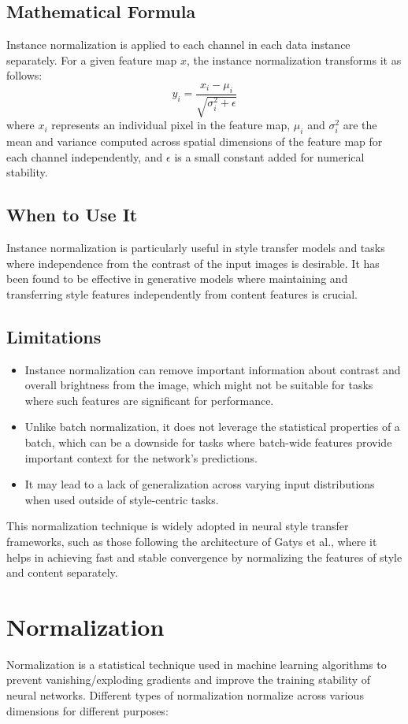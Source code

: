 \documentclass[12pt]{article}
\begin{document}
\subsection{Mathematical Formula}
Instance normalization is applied to each channel in each data instance separately. For a given feature map \(x\), the instance normalization transforms it as follows:
\[
y_i = \frac{x_i - \mu_i}{\sqrt{\sigma_i^2 + \epsilon}}
\]
where \(x_i\) represents an individual pixel in the feature map, \(\mu_i\) and \(\sigma_i^2\) are the mean and variance computed across spatial dimensions of the feature map for each channel independently, and \(\epsilon\) is a small constant added for numerical stability.

\subsection{When to Use It}
Instance normalization is particularly useful in style transfer models and tasks where independence from the contrast of the input images is desirable. It has been found to be effective in generative models where maintaining and transferring style features independently from content features is crucial.

\subsection{Limitations}
\begin{itemize}
    \item Instance normalization can remove important information about contrast and overall brightness from the image, which might not be suitable for tasks where such features are significant for performance.
    \item Unlike batch normalization, it does not leverage the statistical properties of a batch, which can be a downside for tasks where batch-wide features provide important context for the network’s predictions.
    \item It may lead to a lack of generalization across varying input distributions when used outside of style-centric tasks.
\end{itemize}

This normalization technique is widely adopted in neural style transfer frameworks, such as those following the architecture of Gatys et al., where it helps in achieving fast and stable convergence by normalizing the features of style and content separately.

\section{Normalization}
Normalization is a statistical technique used in machine learning algorithms to prevent vanishing/exploding gradients and improve the training stability of neural networks. Different types of normalization normalize across various dimensions for different purposes:
\end{document}
